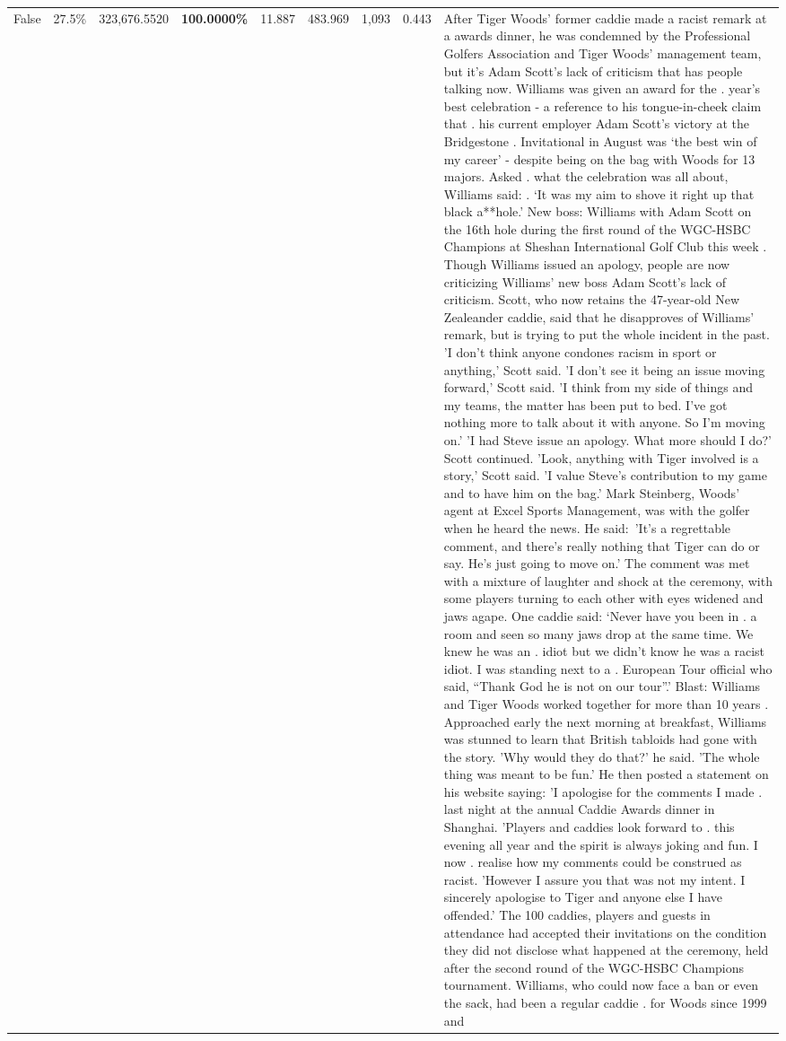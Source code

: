 \begin{table}[H]
\begin{tabular}{lllrlllll}
False & 27.5\% & 323,676.5520 & \bfseries \color{red} 100.0000\% & 11.887 & 483.969 & 1,093 & 0.443 & After Tiger Woods' former caddie made a racist remark at a awards dinner, he was condemned by the Professional Golfers Association and Tiger Woods' management team, but it's Adam Scott's lack of criticism that has people talking now. Williams was given an award for the . year’s best celebration - a reference to his tongue-in-cheek claim that . his current employer Adam Scott’s victory at the Bridgestone . Invitational in August was ‘the best win of my career’ - despite being on the bag with Woods for 13 majors. Asked . what the celebration was all about, Williams said: . ‘It was my aim to shove it right up that black a**hole.’ New boss: Williams with Adam Scott  on the 16th hole during the first round of the WGC-HSBC Champions at Sheshan International Golf Club this week . Though Williams issued an apology, people are now criticizing Williams' new boss Adam Scott's lack of criticism. Scott, who now retains the 47-year-old New Zealeander caddie, said that he disapproves of Williams' remark, but is trying to put the whole incident in the past. 'I don't think anyone condones racism in sport or anything,' Scott said. 'I don't see it being an issue moving forward,' Scott said. 'I think from my side of things and my teams, the matter has been put to bed. I've got nothing more to talk about it with anyone. So I'm moving on.' 'I had Steve issue an apology. What more should I do?' Scott continued. 'Look, anything with Tiger involved is a story,' Scott said. 'I value Steve's contribution to my game and to have him on the bag.' Mark Steinberg, Woods' agent at Excel Sports Management, was with the golfer when he heard the news. He said: 'It's a regrettable comment, and there's really nothing that Tiger can do or say. He's just going to move on.' The comment was met with a mixture of laughter and shock at the ceremony, with some players turning to each other with eyes widened and jaws agape. One caddie said: ‘Never have you been in . a room and seen so many jaws drop at the same time. We knew he was an . idiot but we didn’t know he was a racist idiot. I was standing next to a . European Tour official who said, “Thank God he is not on our tour”.’ Blast: Williams and Tiger Woods worked together for more than 10 years . Approached early the next morning at breakfast, Williams was stunned to learn that British tabloids had gone with the story. 'Why would they do that?' he said. 'The whole thing was meant to be fun.' He then posted a statement on his website saying: 'I apologise for the comments I made . last night at the annual Caddie Awards dinner in Shanghai. 'Players and caddies look forward to . this evening all year and the spirit is always joking and fun. I now . realise how my comments could be construed as racist. 'However I assure you that was not my intent. I sincerely apologise to Tiger and anyone else I have offended.' The 100 caddies, players and guests in attendance had accepted their invitations on the condition they did not disclose what happened at the ceremony, held after the second round of the WGC-HSBC Champions tournament. Williams, who could now face a ban or even the sack, had been a regular caddie . for Woods since 1999 and 
\end{tabular}
\end{table}
